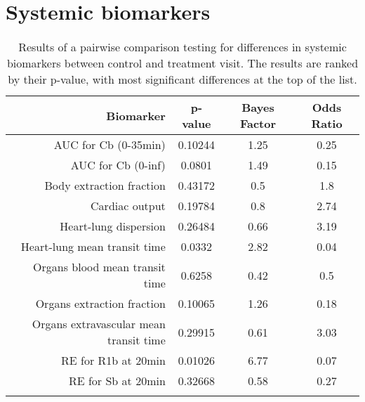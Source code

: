 \documentclass{epflreport}%
\begin{document}
\section{Systemic biomarkers}%
\label{sec:Systemicbiomarkers}%

%
\begin{longtable}{rccc}%
\hline%
Biomarker&p{-}value&Bayes Factor&Odds Ratio\\%
\hline%
AUC for Cb (0{-}35min)&0.10244&1.25&0.25\\%
AUC for Cb (0{-}inf)&0.0801&1.49&0.15\\%
Body extraction fraction&0.43172&0.5&1.8\\%
Cardiac output&0.19784&0.8&2.74\\%
Heart{-}lung dispersion&0.26484&0.66&3.19\\%
Heart{-}lung mean transit time&0.0332&2.82&0.04\\%
Organs blood mean transit time&0.6258&0.42&0.5\\%
Organs extraction fraction&0.10065&1.26&0.18\\%
Organs extravascular mean transit time&0.29915&0.61&3.03\\%
RE for R1b at 20min&0.01026&6.77&0.07\\%
RE for Sb at 20min&0.32668&0.58&0.27\\%
\hline%
\caption{Results of a pairwise comparison testing for differences in systemic biomarkers between control and treatment visit. The results are ranked by their p-value, with most significant differences at the top of the list.} \\%
\end{longtable}%
\end{document}
